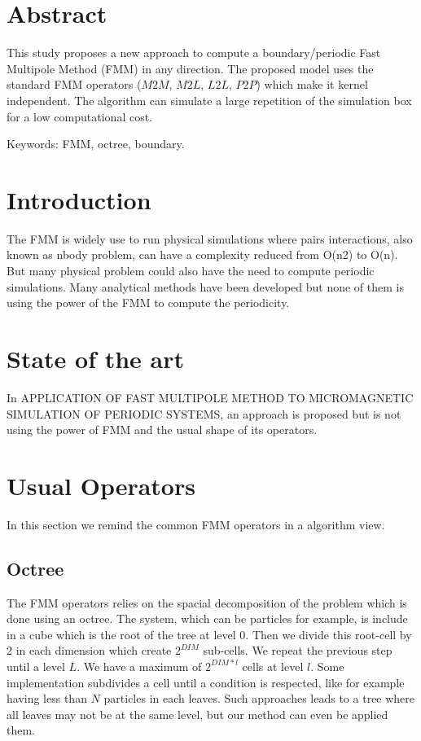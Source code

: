 \documentclass[12pt]{article} %
\begin{document}
\newpage %

\section{Abstract}

This study proposes a new approach to compute a boundary/periodic Fast Multipole Method (FMM) in any direction.
The proposed model uses the standard FMM operators ($M2M$, $M2L$, $L2L$, $P2P$) which make it kernel independent.
The algorithm can simulate a large repetition of the simulation box for a low computational cost.

Keywords: FMM, octree, boundary.

\section{Introduction}
The FMM is widely use to run physical simulations where pairs interactions, also known as nbody problem,
can have a complexity reduced from O(n2) to O(n).
But many physical problem could also have the need to compute periodic simulations.
Many analytical methods have been developed but none of them is using the power of the FMM to compute the periodicity.

\section{State of the art}

In APPLICATION OF FAST MULTIPOLE METHOD TO MICROMAGNETIC SIMULATION OF PERIODIC SYSTEMS, an approach is proposed but
is not using the power of FMM and the usual shape of its operators.

\section{Usual Operators}
In this section we remind the common FMM operators in a algorithm view.

\subsection{Octree}
The FMM operators relies on the spacial decomposition of the problem which is done using an octree.
The system, which can be particles for example, is include in a cube which is the root of the tree at level $0$.
Then we divide this root-cell by $2$ in each dimension which create $2^{DIM}$ sub-cells.
We repeat the previous step until a level $L$. We have a maximum of $2^{DIM*l}$ cells at level $l$.
Some implementation subdivides a cell until a condition is respected, like for example having less than $N$ particles in each leaves.
Such approaches leads to a tree where all leaves may not be at the same level, but our method can even be applied them.
\end{document}
